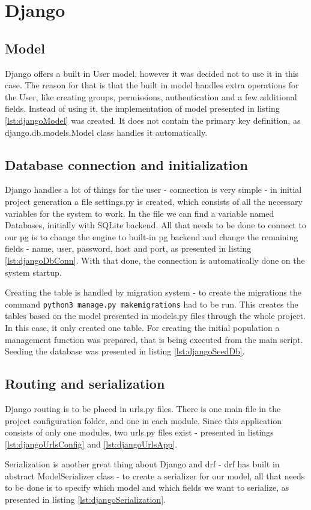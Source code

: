 %
%
\section{Django}
\subsection{Model}\label{sub:djangoModel}
Django offers a built in User model, however it was decided not to use it in this case. The reason for that is that the built in model handles extra operations for the User, like creating groups, permissions, authentication and a few additional fields. Instead of using it, the implementation of model presented in listing \ref{lst:djangoModel} was created. It does not contain the primary key definition, as django.db.models.Model class handles it automatically.


\subsection{Database connection and initialization}
Django handles a lot of things for the user - connection is very simple - in initial project generation a file settings.py is created, which consists of all the necessary variables for the system to work. In the file we can find a variable named Databases, initially with SQLite backend. All that needs to be done to connect to our \acrlong{pg} is to change the engine to built-in \acrshort{pg} backend and change the remaining fields - name, user, password, host and port, as presented in listing \ref{lst:djangoDbConn}. With that done, the connection is automatically done on the system startup.

Creating the table is handled by migration system - to create the migrations the command \lstinline[language=bash]{python3 manage.py makemigrations} had to be run.
This creates the tables based on the model presented in models.py files through the whole project. In this case, it only created one table.
For creating the initial population a management function was prepared, that is being executed from the main script. Seeding the database was presented in listing \ref{lst:djangoSeedDb}.


\subsection{Routing and serialization}
Django routing is to be placed in urls.py files. There is one main file in the project configuration folder, and one in each module. Since this application consists of only one modules, two urls.py files exist - presented in listings \ref{lst:djangoUrlsConfig} and \ref{lst:djangoUrlsApp}.


Serialization is another great thing about Django and \acrlong{drf} - \acrshort{drf} has built in abstract ModelSerializer class - to create a serializer for our model, all that needs to be done is to specify which model and which fields we want to serialize, as presented in listing \ref{lst:djangoSerialization}.


